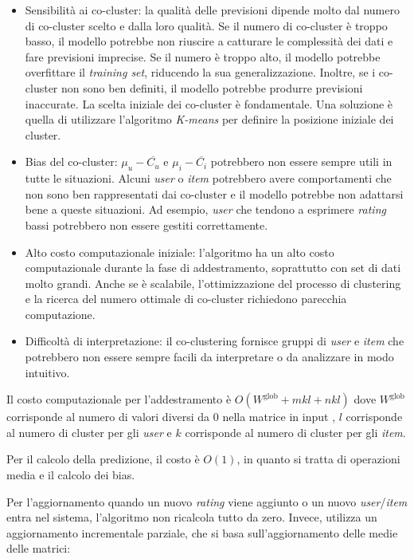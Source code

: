 \begin{itemize}
  \item Sensibilità ai co-cluster: la qualità delle previsioni dipende molto dal numero di co-cluster scelto e dalla loro qualità. Se il numero di co-cluster è troppo basso, il modello potrebbe non riuscire a catturare le complessità dei dati e fare previsioni imprecise. Se il numero è troppo alto, il modello potrebbe overfittare il \textit{training set}, riducendo la sua generalizzazione. Inoltre, se i co-cluster non sono ben definiti, il modello potrebbe produrre previsioni inaccurate. La scelta iniziale dei co-cluster è fondamentale. Una soluzione è quella di utilizzare l'algoritmo \textit{K-means} per definire la posizione iniziale dei cluster.
  \item Bias del co-cluster: $ \mu_u - \overline{C_u} $ e $ \mu_i - \overline{C_i} $ potrebbero non essere sempre utili in tutte le situazioni. Alcuni \textit{user} o \textit{item} potrebbero avere comportamenti che non sono ben rappresentati dai co-cluster e il modello potrebbe non adattarsi bene a queste situazioni. Ad esempio, \textit{user} che tendono a esprimere \textit{rating} bassi potrebbero non essere gestiti correttamente.
  \item Alto costo computazionale iniziale: l'algoritmo ha un alto costo computazionale durante la fase di addestramento, soprattutto con set di dati molto grandi. Anche se è scalabile, l'ottimizzazione del processo di clustering e la ricerca del numero ottimale di co-cluster richiedono parecchia computazione.
  \item Difficoltà di interpretazione: il co-clustering fornisce gruppi di \textit{user} e \textit{item} che potrebbero non essere sempre facili da interpretare o da analizzare in modo intuitivo.
\end{itemize}

Il costo computazionale per l'addestramento è $ O(W^{\text{glob}} + mkl + nkl) $ dove $ W^{\text{glob}} $ corrisponde al numero di valori diversi da 0 nella matrice in input , $l$ corrisponde al numero di cluster per gli \textit{user} e $k$ corrisponde al numero di cluster per gli \textit{item}.

Per il calcolo della predizione, il costo è $O(1)$, in quanto si tratta di operazioni media e il calcolo dei bias.

Per l'aggiornamento quando un nuovo \textit{rating} viene aggiunto o un nuovo \textit{user}/\textit{item} entra nel sistema, l'algoritmo non ricalcola tutto da zero. Invece, utilizza un aggiornamento incrementale parziale, che si basa sull'aggiornamento delle medie delle matrici:

